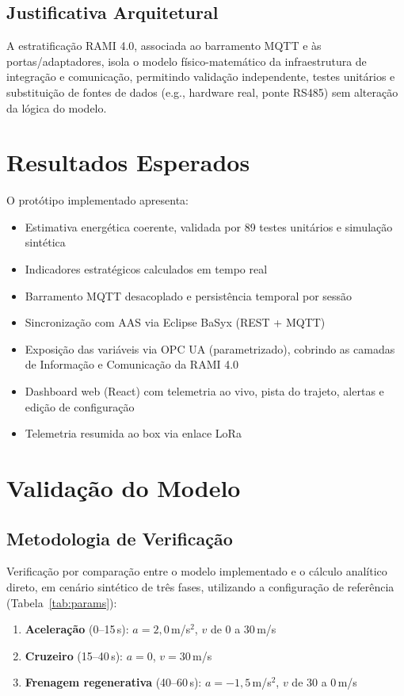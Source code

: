 \documentclass[12pt,a4paper]{report}
\begin{document}
\section{Justificativa Arquitetural}

A estratificação RAMI 4.0, associada ao barramento MQTT e às portas/adaptadores, isola o modelo físico-matemático da infraestrutura de integração e comunicação, permitindo validação independente, testes unitários e substituição de fontes de dados (e.g., hardware real, ponte RS485) sem alteração da lógica do modelo.

\chapter{Resultados Esperados}

O protótipo implementado apresenta:

\begin{itemize}
\item Estimativa energética coerente, validada por 89 testes unitários e simulação sintética
\item Indicadores estratégicos calculados em tempo real
\item Barramento MQTT desacoplado e persistência temporal por sessão
\item Sincronização com AAS via Eclipse BaSyx (REST + MQTT)
\item Exposição das variáveis via OPC UA (parametrizado), cobrindo as camadas de Informação e Comunicação da RAMI 4.0
\item Dashboard web (React) com telemetria ao vivo, pista do trajeto, alertas e edição de configuração
\item Telemetria resumida ao box via enlace LoRa
\end{itemize}

\chapter{Validação do Modelo}

\section{Metodologia de Verificação}

Verificação por comparação entre o modelo implementado e o cálculo analítico direto, em cenário sintético de três fases, utilizando a configuração de referência (Tabela~\ref{tab:params}):

\begin{enumerate}
    \item \textbf{Aceleração} (0--15\,s): $a = 2{,}0$\,m/s$^2$, $v$ de 0 a 30\,m/s
    \item \textbf{Cruzeiro} (15--40\,s): $a = 0$, $v = 30$\,m/s
    \item \textbf{Frenagem regenerativa} (40--60\,s): $a = -1{,}5$\,m/s$^2$, $v$ de 30 a 0\,m/s
\end{enumerate}
\end{document}

